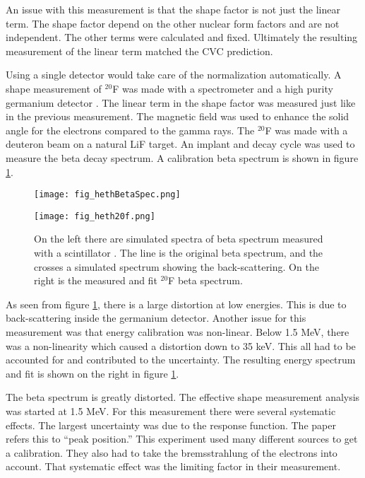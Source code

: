 \documentclass[../MaxHughesThesis.tex]{subfiles}
\begin{document}
An issue with this measurement is that the shape factor is not just the linear term.
The shape factor depend on the other nuclear form factors and are not independent.
The other terms were calculated and fixed.
Ultimately the resulting measurement of the linear term matched the CVC prediction.

Using a single detector would take care of the normalization automatically. 
A shape measurement of $^{20}$F was made with a spectrometer and a high purity germanium detector \cite{Het89}.
The linear term in the shape factor was measured just like in the previous measurement.
The magnetic field was used to enhance the solid angle for the electrons compared to the gamma rays.
The $^{20}$F was made with a deuteron beam on a natural LiF target. 
An implant and decay cycle was used to measure the beta decay spectrum. 
A calibration beta spectrum is shown in figure \ref{fig:hethspec}.

\begin{figure}[!htb]
	\centering
	\begin{minipage}{0.50\textwidth}
		\centerline{\texttt{[image: fig\_hethBetaSpec.png]}}
	\end{minipage}\hfill
	\begin{minipage}{0.50\textwidth}
		\centerline{\texttt{[image: fig\_heth20f.png]}}
	\end{minipage}
	\caption{On the left there are simulated spectra of beta spectrum measured with a scintillator \cite{Het89}.
		 The line is the original beta spectrum, and the crosses a simulated spectrum showing the back-scattering.
		 On the right is the measured and fit $^{20}$F beta spectrum.}
	\label{fig:hethspec}
\end{figure}

As seen from figure \ref{fig:hethspec}, there is a large distortion at low energies.
This is due to back-scattering inside the germanium detector.
Another issue for this measurement was that energy calibration was non-linear.
Below 1.5 MeV, there was a non-linearity which caused a distortion down to 35 keV. 
This all had to be accounted for and contributed to the uncertainty.
The resulting energy spectrum and fit is shown on the right in figure \ref{fig:hethspec}.


The beta spectrum is greatly distorted.
The effective shape measurement analysis was started at 1.5 MeV.
For this measurement there were several systematic effects.
The largest uncertainty was due to the response function.
The paper refers this to ``peak position.'' 
This experiment used many different sources to get a calibration.
They also had to take the bremsstrahlung of the electrons into account.
That systematic effect was the limiting factor in their measurement.
\end{document}
